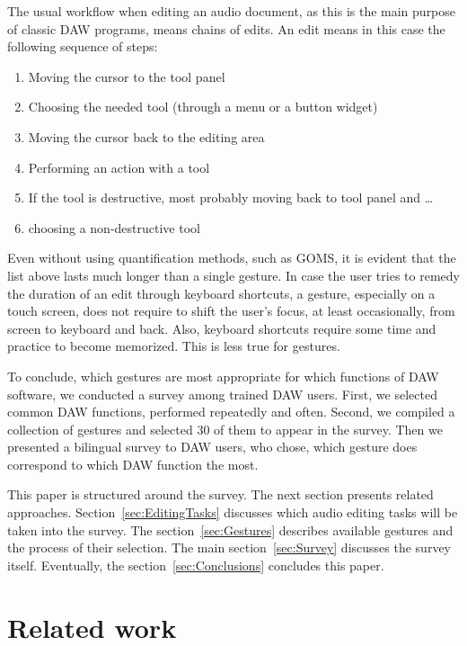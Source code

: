 \documentclass{aes130}
\begin{document}
The usual workflow when editing an audio document, as this is the main purpose of classic DAW programs, means chains
of edits. An edit means in this case the following sequence of steps:

\begin{enumerate}
\item Moving the cursor to the tool panel
\item Choosing the needed tool (through a menu or a button widget)
\item Moving the cursor back to the editing area
\item Performing an action with a tool
\item If the tool is destructive, most probably moving back to tool panel and \ldots
\item choosing a non-destructive tool
\end{enumerate}

Even without using quantification methods, such as GOMS\cite{Card:1983:PHI:578027}, it is evident
that the list above lasts much longer than a single gesture. In case the user tries to remedy the duration
of an edit through keyboard shortcuts, a gesture, especially on a touch screen, does not require to shift the user's
focus, at least occasionally, from screen to keyboard and back. Also, keyboard shortcuts require some time
and practice to become memorized. This is less true for gestures\cite{Appert:2009:USC:1518701.1519052}.

To conclude, which gestures are most appropriate for which functions of DAW software, we conducted
a survey among trained DAW users. First, we selected common DAW functions, performed repeatedly and often.
Second, we compiled a collection of gestures and selected 30 of them to appear in the survey. Then
we presented a bilingual survey to DAW users, who chose, which gesture does correspond to which DAW function
the most.

This paper is structured around the survey. The next section presents related approaches.
Section~\ref{sec:EditingTasks} discusses which audio editing tasks will be taken into the survey.
The section~\ref{sec:Gestures} describes available gestures and the process of their selection.
The main section~\ref{sec:Survey} discusses the survey itself. Eventually, the section~\ref{sec:Conclusions}
concludes this paper.

\section{Related work}
\end{document}
